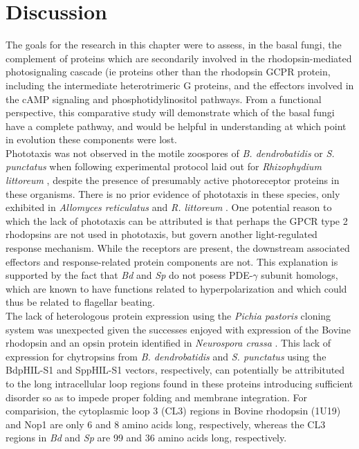 \section{Discussion}
The goals for the research in this chapter were to assess, in the basal fungi, the complement of proteins which are secondarily involved in the rhodopsin-mediated photosignaling cascade (ie proteins other than the rhodopsin GCPR protein, including the intermediate heterotrimeric G proteins, and the effectors involved in the cAMP signaling and phosphotidylinositol pathways. From a functional perspective, this comparative study will demonstrate which of the basal fungi have a complete pathway, and would be helpful in understanding at which point in evolution these components were lost.\\
\indent Phototaxis was not observed in the motile zoospores of \textit{B. dendrobatidis} or \textit{S. punctatus} when following experimental protocol laid out for \textit{Rhizophydium littoreum} \cite{Muehlstein1987}, despite the presence of presumably active photoreceptor proteins in these organisms. There is no prior evidence of phototaxis in these species, only exhibited in \textit{Allomyces reticulatus} \cite{Saranak1997} and \textit{R. littoreum} \cite{Muehlstein1987}. One potential reason to which the lack of phototaxis can be attributed is that perhaps the GPCR type 2 rhodopsins are not used in phototaxis, but govern another light-regulated response mechanism. While the receptors are present, the downstream associated effectors and response-related protein components are not. This explanation is supported by the fact that \textit{Bd} and \textit{Sp} do not posess PDE-$\gamma$ subunit homologs, which are known to have functions related to hyperpolarization and which could thus be related to flagellar beating.\\
\indent The lack of heterologous protein expression using the \textit{Pichia pastoris} cloning system was unexpected given the successes enjoyed with expression of the Bovine rhodopsin \cite{Abdulaev1997} and an opsin protein identified in \textit{Neurospora crassa} \cite{Bieszke1999}. This lack of expression for chytropsins from \textit{B. dendrobatidis} and \textit{S. punctatus} using the BdpHIL-S1 and SppHIL-S1 vectors, respectively, can potentially be attribituted to the long intracellular loop regions found in these proteins introducing sufficient disorder so as to impede proper folding and membrane integration. For comparision, the cytoplasmic loop 3 (CL3) regions in Bovine rhodopsin (1U19) and Nop1 are only 6 and 8 amino acids long, respectively, whereas the CL3 regions in \textit{Bd} and \textit{Sp} are 99 and 36 amino acids long, respectively.\\
